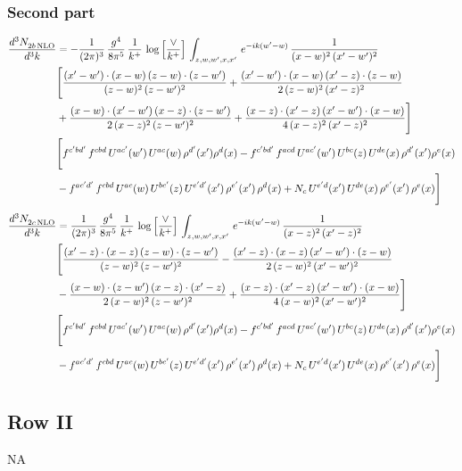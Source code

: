 \documentclass[9pt]{article}
\numberwithin{equation}{section}
\begin{document}
\subsubsection{Second part}
\begin{align}
\frac{d^{3}N_{2b\,\rm NLO}^{\rm}}{d^{3}k}  & = -\frac{1}{(2\pi)^{3}}\, \frac{g^{4}}{8\pi^{5}}\,\frac{1}{k^{+}}\,\log{\left[\frac{\vee}{k^{+}}\right]}\,\int_{z,w,w^{\prime},x,x'}\, e^{-ik(w^{\prime}-w)}\, \frac{1}{(x-w)^{2}\,(x'-w')^{2}} \notag \\
& \Bigg[\frac{(x'-w')\cdot (x-w)\, (z-w)\cdot (z-w')}{(z-w)^{2}\, (z-w')^{2}}+\frac{(x'-w')\cdot (x-w)\, (x'-z)\cdot (z-w)}{2\, (z-w)^{2}\, (x'-z)^{2}}\notag \\
& +\frac{(x-w)\cdot (x'-w')\, (x-z)\cdot (z-w')}{2\, (x-z)^{2}\, (z-w')^{2}}+\frac{(x-z)\cdot (x'-z)\, (x'-w')\cdot (x-w)}{4\, (x-z)^{2}\, (x'-z)^{2}}\Bigg]\notag \\
& \Bigg[f^{c'bd'}\,f^{cbd}\, U^{ac'}(w')\,U^{ac}(w)\,\rho^{d'}(x')\rho^{d}(x)- f^{c'bd'}\,f^{acd}\,U^{ac'}(w')\,U^{bc}(z)\,U^{de}(x)\,\rho^{d'}(x')\rho^{e}(x)\notag \\
& -f^{ac'd'}\,f^{cbd}\,U^{ac}(w)\,U^{bc'}(z)\,U^{e'd'}(x')\,\rho^{e'}(x')\,\rho^{d}(x) +N_{c}\,U^{e'd}(x')\,U^{de}(x)\,\rho^{e'}(x')\,\rho^{e}(x)\Bigg]
\end{align}
\begin{align}
\frac{d^{3}N_{2c\,\rm NLO}^{\rm}}{d^{3}k}  & = \frac{1}{(2\pi)^{3}}\, \frac{g^{4}}{8\pi^{5}}\,\frac{1}{k^{+}}\,\log{\left[\frac{\vee}{k^{+}}\right]}\,\int_{z,w,w^{\prime},x,x'}\, e^{-ik(w^{\prime}-w)}\, \frac{1}{(x-z)^{2}\,(x'-z)^{2}} \notag \\
& \Bigg[\frac{(x'-z)\cdot (x-z)\, (z-w)\cdot (z-w')}{(z-w)^{2}\, (z-w')^{2}}-\frac{(x'-z)\cdot (x-z)\, (x'-w')\cdot (z-w)}{2\, (z-w)^{2}\, (x'-w')^{2}}\notag \\
& -\frac{(x-w)\cdot (z-w')\, (x-z)\cdot (x'-z)}{2\, (x-w)^{2}\, (z-w')^{2}}+\frac{(x-z)\cdot (x'-z)\, (x'-w')\cdot (x-w)}{4\, (x-w)^{2}\, (x'-w')^{2}}\Bigg]\notag \\
& \Bigg[f^{c'bd'}\,f^{cbd}\, U^{ac'}(w')\,U^{ac}(w)\,\rho^{d'}(x')\rho^{d}(x)- f^{c'bd'}\,f^{acd}\,U^{ac'}(w')\,U^{bc}(z)\,U^{de}(x)\,\rho^{d'}(x')\rho^{e}(x)\notag \\
& -f^{ac'd'}\,f^{cbd}\,U^{ac}(w)\,U^{bc'}(z)\,U^{e'd'}(x')\,\rho^{e'}(x')\,\rho^{d}(x) +N_{c}\,U^{e'd}(x')\,U^{de}(x)\,\rho^{e'}(x')\,\rho^{e}(x)\Bigg]
\end{align}
\subsection{Row II}
\textsc{NA}
\end{document}
